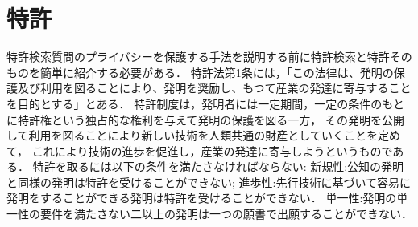 \documentclass[master]{suribt}
\theoremstyle{definition}
\begin{document}
 \chapter{特許}
 特許検索質問のプライバシーを保護する手法を説明する前に特許検索と特許そのものを簡単に紹介する必要がある．
 特許法第1条には，「この法律は、発明の保護及び利用を図ることにより、発明を奨励し、もつて産業の発達に寄与することを目的とする」とある．
 特許制度は，発明者には一定期間，一定の条件のもとに特許権という独占的な権利を与えて発明の保護を図る一方，
 その発明を公開して利用を図ることにより新しい技術を人類共通の財産としていくことを定めて，
 これにより技術の進歩を促進し，産業の発達に寄与しようというものである．\cite{https://www.jpo.go.jp/seido/s_tokkyo/chizai04.htm}
 特許を取るには以下の条件を満たさなければならない:
 新規性:公知の発明と同様の発明は特許を受けることができない;
 進歩性:先行技術に基づいて容易に発明をすることができる発明は特許を受けることができない．
 単一性:発明の単一性の要件を満たさない二以上の発明は一つの願書で出願することができない．
\end{document}
